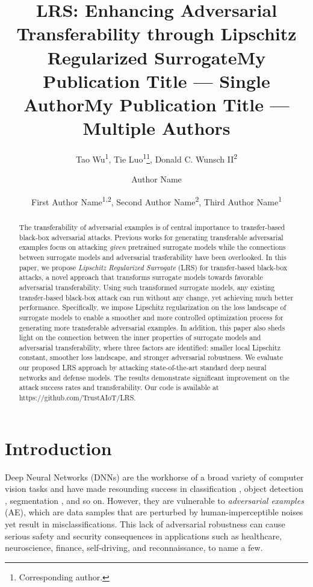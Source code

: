 \documentclass[letterpaper]{article} %
\title{LRS: Enhancing Adversarial Transferability through Lipschitz Regularized Surrogate}
\author{
    Tao Wu\textsuperscript{\rm 1},
    Tie Luo\textsuperscript{\rm 1}\thanks{Corresponding author.}, 
    Donald C. Wunsch II\textsuperscript{\rm 2}
}
\title{My Publication Title --- Single Author}
\author {
    Author Name
}
\title{My Publication Title --- Multiple Authors}
\author {
    First Author Name\textsuperscript{\rm 1,\rm 2},
    Second Author Name\textsuperscript{\rm 2},
    Third Author Name\textsuperscript{\rm 1}
}
\theoremstyle{plain}
\theoremstyle{definition}
\begin{document}
\maketitle

\begin{abstract}
The transferability of adversarial examples is of central importance to transfer-based black-box adversarial attacks. Previous works for generating transferable adversarial examples focus on attacking \emph{given} pretrained surrogate models while the connections between surrogate models and adversarial trasferability have been overlooked. In this paper, we propose {\em Lipschitz Regularized Surrogate} (LRS) for transfer-based black-box attacks, a novel approach that transforms surrogate models towards favorable adversarial transferability. Using such transformed surrogate models, any existing transfer-based black-box attack can run without any change, yet achieving much better performance. Specifically, we impose Lipschitz regularization on the loss landscape of surrogate models to enable a smoother and more controlled optimization process for generating more transferable adversarial examples. In addition, this paper also sheds light on the connection between the inner properties of surrogate models and adversarial transferability, where three factors are identified: smaller local Lipschitz constant, smoother loss landscape, and stronger adversarial robustness. We evaluate our proposed LRS approach by attacking state-of-the-art standard deep neural networks and defense models. The results demonstrate significant improvement on the attack success rates and transferability. Our code is available at https://github.com/TrustAIoT/LRS.
\end{abstract}

\section{Introduction}

Deep Neural Networks (DNNs) are the workhorse of a broad variety of computer vision tasks and have made resounding success in classification \cite{he2016resnet}, object detection \cite{redmon2016you}, segmentation \cite{ronneberger2015u}, and so on. However, they are vulnerable to \emph{adversarial examples} (AE), which are data samples that are perturbed by human-imperceptible noises yet result in misclassifications. This lack of adversarial robustness can cause serious safety and security consequences in applications such as healthcare, neuroscience, finance, self-driving, and reconnaissance, to name a few.
\end{document}

